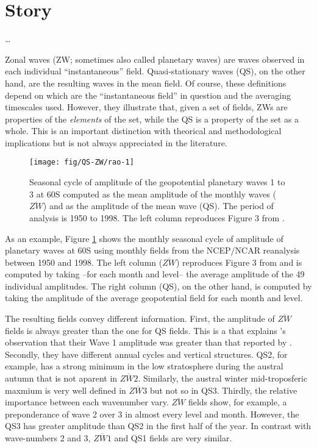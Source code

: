 \documentclass[draft,linenumbers]{agujournal2018}
\begin{document}
\section{Story}

\ldots{}

Zonal waves (ZW; sometimes also called planetary waves) are waves
observed in each individual ``instantaneous'' field. Quasi-stationary
waves (QS), on the other hand, are the resulting waves in the mean
field. Of course, these definitions depend on which are the
``instantaneous field'' in question and the averaging timescales used.
However, they illustrate that, given a set of fields, ZWs are properties
of the \emph{elements} of the set, while the QS is a property of the set
as a whole. This is an important distinction with theorical and
methodological implications but is not always appreciated in the
literature.

\begin{figure}[h]
\texttt{[image: fig/QS-ZW/rao-1]} \caption{Seasonal cycle of amplitude of the geopotential planetary waves 1 to 3 at 60\degree S computed as the mean amplitude of the monthly waves ($\overline{ZW}$) and as the amplitude of the mean wave (QS). The period of analysis is 1950 to 1998. The left column reproduces Figure 3 from \citet{Rao2004}.}\label{fig:rao}
\end{figure}

As an example, Figure \ref{fig:rao} shows the monthly seasonal cycle of
amplitude of planetary waves at 60\degree S using monthly fields from
the NCEP/NCAR reanalysis \citep{Kalnay1996} between 1950 and 1998. The
left column (\(\overline{ZW}\)) reproduces Figure 3 from \citet{Rao2004}
and is computed by taking --for each month and level-- the average
amplitude of the 49 individual amplitudes. The right column (QS), on the
other hand, is computed by taking the amplitude of the average
geopotential field for each month and level.

The resulting fields convey different information. First, the amplitude
of \(\overline{ZW}\) fields is always greater than the one for QS
fields. This is a
that explains \citet{Rao2004}'s observation that their Wave 1 amplitude
was greater than that reported by \citet{Hurrell1998}. Secondly, they
have different annual cycles and vertical structures. QS2, for example,
has a strong minimum in the low stratosphere during the austral autumn
that is not aparent in \(\overline{ZW2}\). Similarly, the austral winter
mid-troposferic maxmium is very well defined in \(\overline{ZW3}\) but
not so in QS3. Thirdly, the relative importance between each wavenumber
vary. \(\overline{ZW}\) fields show, for example, a preponderance of
wave 2 over 3 in almost every level and month. However, the QS3 has
greater amplitude than QS2 in the first half of the year. In contrast
with wave-numbers 2 and 3, \(\overline{ZW1}\) and QS1 fields are very
similar.
\end{document}
